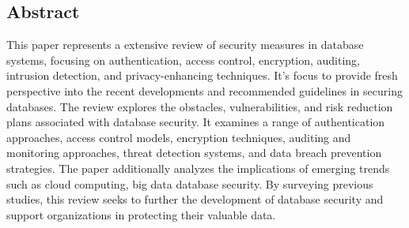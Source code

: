 \documentclass[12pt]{book} %
\begin{document}







{}












\setcounter{page}{1}




\subsection*{Abstract}

This paper represents a extensive review of security measures in database systems, focusing on authentication, access control, encryption, auditing, intrusion detection, and privacy-enhancing techniques. It's focus to provide fresh perspective into the recent developments and recommended guidelines in securing databases. The review  explores the obstacles, vulnerabilities, and risk reduction plans associated with 
database security. It examines a range of authentication approaches, access control models, encryption techniques, auditing and monitoring approaches, threat detection systems, and data breach prevention strategies. The paper additionally analyzes the implications of emerging trends such as cloud computing, big data database security. By surveying previous studies, this review seeks to further the development of database security and support organizations in protecting their valuable data.\cite{a_comprve_rev_of_sec_measr_in_db_sys_assess_auth_accss_ctrl_bynd} \label{sec:a_comprve_rev_of_sec_measr_in_db_sys_assess_auth_accss_ctrl_bynd_1}\\
\end{document}
